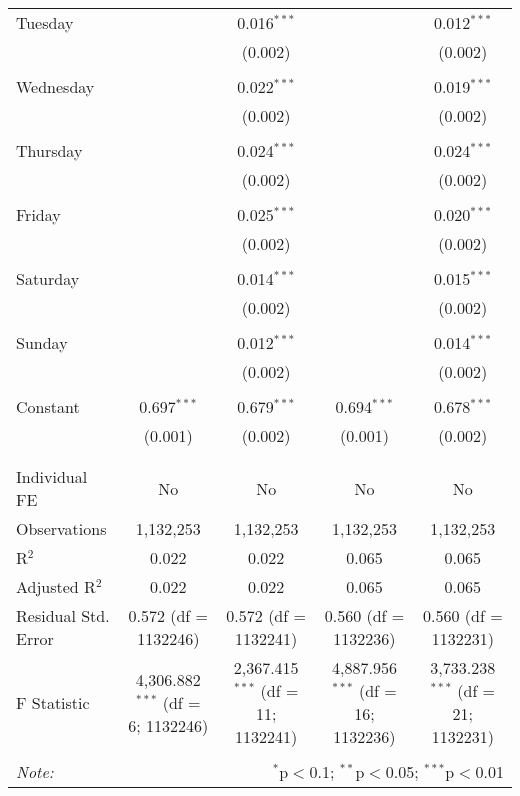\documentclass[
]{article}
\begin{document}
\begin{table}[!htbp]
{\begin{tabular}{@{\extracolsep{5pt}}lcccc}
 Tuesday &  & 0.016$^{***}$ &  & 0.012$^{***}$ \\ 
  &  & (0.002) &  & (0.002) \\ 
  & & & & \\ 
 Wednesday &  & 0.022$^{***}$ &  & 0.019$^{***}$ \\ 
  &  & (0.002) &  & (0.002) \\ 
  & & & & \\ 
 Thursday &  & 0.024$^{***}$ &  & 0.024$^{***}$ \\ 
  &  & (0.002) &  & (0.002) \\ 
  & & & & \\ 
 Friday &  & 0.025$^{***}$ &  & 0.020$^{***}$ \\ 
  &  & (0.002) &  & (0.002) \\ 
  & & & & \\ 
 Saturday &  & 0.014$^{***}$ &  & 0.015$^{***}$ \\ 
  &  & (0.002) &  & (0.002) \\ 
  & & & & \\ 
 Sunday &  & 0.012$^{***}$ &  & 0.014$^{***}$ \\ 
  &  & (0.002) &  & (0.002) \\ 
  & & & & \\ 
 Constant & 0.697$^{***}$ & 0.679$^{***}$ & 0.694$^{***}$ & 0.678$^{***}$ \\ 
  & (0.001) & (0.002) & (0.001) & (0.002) \\ 
  & & & & \\ 
\hline \\[-1.8ex] 
Individual FE & No & No & No & No \\ 
Observations & 1,132,253 & 1,132,253 & 1,132,253 & 1,132,253 \\ 
R$^{2}$ & 0.022 & 0.022 & 0.065 & 0.065 \\ 
Adjusted R$^{2}$ & 0.022 & 0.022 & 0.065 & 0.065 \\ 
Residual Std. Error & 0.572 (df = 1132246) & 0.572 (df = 1132241) & 0.560 (df = 1132236) & 0.560 (df = 1132231) \\ 
F Statistic & 4,306.882$^{***}$ (df = 6; 1132246) & 2,367.415$^{***}$ (df = 11; 1132241) & 4,887.956$^{***}$ (df = 16; 1132236) & 3,733.238$^{***}$ (df = 21; 1132231) \\ 
\hline 
\hline \\[-1.8ex] 
\textit{Note:}  & \multicolumn{4}{r}{$^{*}$p$<$0.1; $^{**}$p$<$0.05; $^{***}$p$<$0.01} \\ 
\end{tabular}
} 
\end{table} 
\newpage
\end{document}
